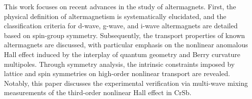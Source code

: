 ﻿%



\begin{abstract}
本文围绕交错磁体的前沿研究展开。系统阐释了交错磁性的物理内涵，并基于自旋群对称性原理，
详细论述了d波、g波及i波交错磁体的分类准则。在此基础上，本文探讨了已知交错磁体引入自旋轨道耦合（SOC）
后的新奇输运性质，
重点讨论了贝利曲率四极矩诱导的三阶非线性反常霍尔效应，并通过对称性分析揭示了晶格与自旋对称性对高阶非线性输运的内在约束机制。
特别地，基于CrSb单晶的旋转角度依赖测量和多波混频实验，验证了三阶横向非线性霍尔响应的各向异性及其瞬时宽带（${>}100\,\mathrm{kHz}$）特性。
\end{abstract}

\begin{abstract*}
This work focuses on recent advances in the study of altermagnets. First, the physical definition of altermagnetism is systematically elucidated, and the classification criteria for d-wave, g-wave, and i-wave altermagnets are detailed based on spin-group symmetry. Subsequently, the transport properties of known altermagnets are discussed, with particular emphasis on the nonlinear anomalous Hall effect induced by the interplay of quantum geometry and Berry curvature multipoles. Through symmetry analysis, the intrinsic constraints imposed by lattice and spin symmetries on high-order nonlinear transport are revealed. Notably, this paper discusses the experimental verification via multi-wave mixing measurements of the third-order nonlinear Hall effect in CrSb.
\end{abstract*}
